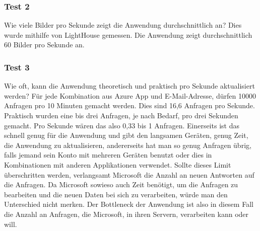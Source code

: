 \subsubsection{Test 2}\label{subsubsec:test-2}
\newline
\newline
Wie viele Bilder pro Sekunde zeigt die Anwendung durchschnittlich an?
Dies wurde mithilfe von LightHouse gemessen.
Die Anwendung zeigt durchschnittlich 60 Bilder pro Sekunde an.
\newline
\newline
\subsubsection{Test 3}\label{subsubsec:test-3}
\newline
\newline
{}
Wie oft, kann die Anwendung theoretisch und praktisch pro Sekunde aktualisiert werden?
Für jede Kombination aus Azure App und E-Mail-Adresse, dürfen 10000 Anfragen pro 10 Minuten gemacht werden.
Dies sind 16,6 Anfragen pro Sekunde.
Praktisch wurden eine bis drei Anfragen, je nach Bedarf, pro drei Sekunden gemacht.
Pro Sekunde wären das also 0,33 bis 1 Anfragen.
Einerseits ist das schnell genug für die Anwendung und gibt den langsamen Geräten, genug Zeit, die Anwendung zu aktualisieren, andererseits hat man so genug Anfragen übrig, falls jemand sein Konto mit mehreren Geräten benutzt oder dies in Kombinationen mit anderen Applikationen verwendet.
Sollte dieses Limit überschritten werden, verlangsamt Microsoft die Anzahl an neuen Antworten auf die Anfragen.
Da Microsoft sowieso auch Zeit benötigt, um die Anfragen zu bearbeiten und die neuen Daten bei sich zu verarbeiten, würde man den Unterschied nicht merken.
Der \gls{Bottleneck} der Anwendung ist also in diesem Fall die Anzahl an Anfragen, die Microsoft, in ihren Servern, verarbeiten kann oder will.
\newline
\newline
